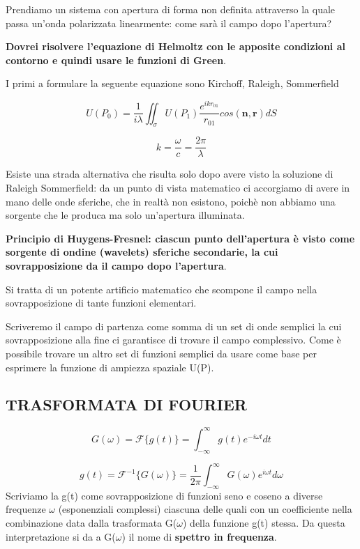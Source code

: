 \documentclass{article}
\begin{document}
Prendiamo un sistema con apertura di forma non definita attraverso la quale passa un'onda polarizzata linearmente: come sarà il campo dopo l'apertura?

\textbf{Dovrei risolvere l'equazione di Helmoltz con le apposite condizioni al contorno e quindi usare le funzioni di Green}.

I primi a formulare la seguente equazione sono Kirchoff, Raleigh, Sommerfield

\begin{equation}
U(P_{0}) = \frac{1}{i\lambda} \iint_\sigma U(P_{1}) \frac{e^{i k r_{01}}}{r_{01}} cos(\textbf{n} ,\textbf{r})dS
\end{equation}

\begin{equation}
k=\frac{\omega}{c}  = \frac{2\pi}{\lambda}
\end{equation}

Esiste una strada alternativa che risulta solo dopo avere visto la soluzione di Raleigh Sommerfield: da un punto di vista matematico ci accorgiamo di avere in mano delle onde sferiche, che in realtà non esistono, poichè non abbiamo una sorgente che le produca ma solo un'apertura illuminata.

\textbf{Principio di Huygens-Fresnel: ciascun punto dell'apertura è visto come sorgente di ondine (wavelets) sferiche secondarie, la cui sovrapposizione da il campo dopo l'apertura}.

Si tratta di un potente artificio matematico che scompone il campo nella sovrapposizione di tante funzioni elementari.

Scriveremo il campo di partenza come somma di un set di onde semplici la cui sovrapposizione alla fine ci garantisce di trovare il campo complessivo.
Come è possibile trovare un altro set di funzioni semplici da usare come base per esprimere la funzione di ampiezza spaziale U(P).

\subsection{TRASFORMATA DI FOURIER}

\begin{equation}
G(\omega)=\mathscr{F}\{g(t)\} =\int_{-\infty}^{\infty} g(t) e^{-i\omega t}dt
\end{equation}
	
\begin{equation}
g(t)= \mathscr{F}^{-1} 	 \{G(\omega)\} =\frac{1}{2\pi}\int_{-\infty}^{\infty} G(\omega) e^{i\omega t}d\omega
\end{equation}
Scriviamo la g(t) come sovrapposizione di funzioni seno e coseno a diverse frequenze $ \omega $ (esponenziali complessi) ciascuna delle quali con un coefficiente nella combinazione data dalla trasformata G($\omega$) della funzione g(t) stessa. Da questa interpretazione si da a G($\omega$) il nome di \textbf{spettro in frequenza}.
\end{document}
